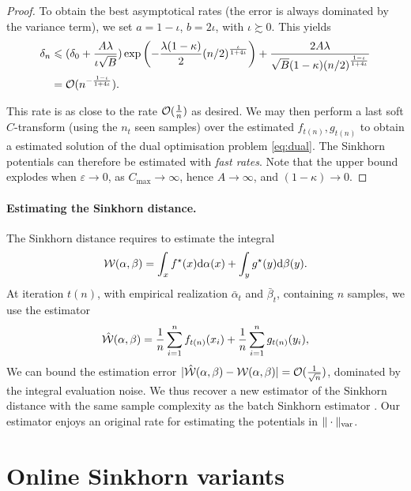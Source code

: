 \begin{proof}
To obtain the best asymptotical rates (the error is always dominated by the variance term), we set $a = 1 - \iota$, $ b = 2 \iota$, with $\iota \succsim 0$. This yields
\begin{align}
    \delta_n &\leqslant 
    (\delta_0 + \frac{A \lambda}{\iota \sqrt{B}})
    \exp\left(- \frac{\lambda(1 - \kappa)}{2} {(n/2)}^{\frac{\iota}{1 + 4\iota}}\right)
    + \frac{2 A \lambda}{\sqrt{B}(1 - \kappa) {(n/2)}^{\frac{1 - \iota}{1 + 4\iota}}} \\
    &= \mathcal{O}(n^{-\frac{1 - \iota}{1 + 4 \iota}}).
\end{align}

This rate is as close to the rate $\mathcal{O}(\frac{1}{n})$ as desired. We may then
perform a last soft $C$-transform (using the $n_t$ seen samples) over the
estimated $f_{t(n)}, g_{t(n)}$ to obtain a estimated solution of the dual
optimisation problem \eqref{eq:dual}. The Sinkhorn potentials can therefore be
estimated with \textit{fast rates}. Note that the upper bound explodes when $\varepsilon
\to 0$, as $C_{\max} \to \infty$, hence $A \to \infty$, and $(1 - \kappa) \to 0$.
\end{proof}

\paragraph{Estimating the Sinkhorn distance.} The Sinkhorn distance requires to estimate the integral
\begin{equation}
    \mathcal{W}(\alpha, \beta) = \int_x f^\star(x) \textrm{d} \alpha(x) + \int_y g^\star(y) \textrm{d} \beta(y).
\end{equation}
At iteration $t(n)$, with empirical realization $\bar \alpha_t$ and $\bar
\beta_t$, containing $n$ samples, we use the estimator
\begin{equation}
    \hat {\mathcal{W}}(\alpha, \beta) = \frac{1}{n} \sum_{i=1}^n f_{t(n)}(x_i) + \frac{1}{n} \sum_{i=1}^n g_{t(n)}(y_i),
\end{equation}
We can bound the estimation error $|\hat {\mathcal{W}}(\alpha, \beta) - \mathcal{W}(\alpha, \beta)
| = \mathcal{O}(\frac{1}{\sqrt{n}})$, dominated by the integral evaluation noise. We
thus recover a new estimator of the Sinkhorn distance with the same sample
complexity as the batch Sinkhorn estimator \citep{2019-Genevay-aistats}. Our
estimator enjoys an original rate for estimating the potentials in $\Vert \cdot
\Vert_{\text{\upshape var}}$.

\pagebreak
\section{Online Sinkhorn variants}

